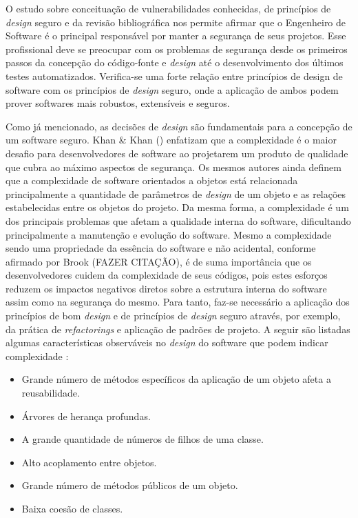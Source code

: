 %

O estudo sobre conceituação de vulnerabilidades conhecidas, de princípios de \emph{design} seguro e da revisão bibliográfica nos permite afirmar que o Engenheiro de Software é o principal responsável por manter a segurança de seus projetos. Esse profissional deve se preocupar com os problemas de segurança desde os primeiros passos da concepção do código-fonte e \emph{design} até o desenvolvimento dos últimos testes automatizados. Verifica-se uma forte relação entre princípios de design de software com os princípios de \emph{design} seguro, onde a aplicação de ambos podem prover softwares mais robustos, extensíveis e seguros. 

%

Como já mencionado, as decisões de \emph{design} são fundamentais para a concepção de um software seguro. Khan \& Khan (\citeyear{khan2010}) enfatizam que a complexidade é o maior desafio para desenvolvedores de software ao projetarem um produto de qualidade que cubra ao máximo aspectos de segurança. Os mesmos autores ainda definem que a complexidade de software orientados a objetos está relacionada principalmente a quantidade de parâmetros de \emph{design} de um objeto e as relações estabelecidas entre os objetos do projeto. Da mesma forma, a complexidade é um dos principais problemas que afetam a qualidade interna do software, dificultando principalmente a manutenção e evolução do software. Mesmo a complexidade sendo uma propriedade da essência do software e não acidental, conforme afirmado por Brook (FAZER CITAÇÃO), é de suma importância que os desenvolvedores cuidem da complexidade de seus códigos, pois estes esforços reduzem os impactos negativos diretos sobre a estrutura interna do software assim como na segurança do mesmo.
Para tanto, faz-se necessário a aplicação dos princípios de bom \emph{design} e de princípios de \emph{design} seguro através, por exemplo, da prática de \emph{refactorings} e aplicação de padrões de projeto. A seguir são listadas algumas características observáveis no \emph{design} do software que podem indicar complexidade \cite{khan2010}:

%

\begin{itemize}
\item Grande número de métodos específicos da aplicação de um objeto afeta a reusabilidade.
\item Árvores de herança profundas.
\item A grande quantidade de números de filhos de uma classe.
\item Alto acoplamento entre objetos.
\item Grande número de métodos públicos de um objeto.
\item Baixa coesão de classes. 
\end{itemize}

